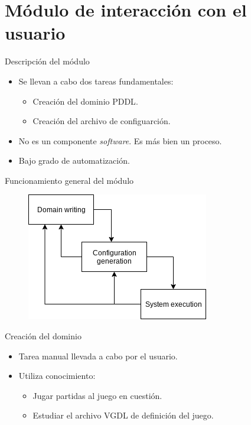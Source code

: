 \documentclass[11pt]{beamer}    %
\begin{document}
    \section{Módulo de interacción con el usuario}

    \begin{frame}{Descripción del módulo}

        \begin{itemize}
            \item Se llevan a cabo dos tareas fundamentales:
                \begin{itemize}
                    \item Creación del \alert{dominio PDDL}.
                    \item Creación del \alert{archivo de configuarción}.
                \end{itemize}
            \item No es un componente \textit{software}. Es más bien un \alert{proceso}.
            \item Bajo grado de automatización.
        \end{itemize}
    \end{frame}

    \begin{frame}{Funcionamiento general del módulo}
        \begin{figure}
            \centering
            \includegraphics[scale=0.5]{img/presentation/cascade_model}
        \end{figure}
    \end{frame}
    
    \begin{frame}{Creación del dominio}
        \begin{itemize}
            \item Tarea manual llevada a cabo por el usuario.
            \item Utiliza conocimiento:
            \begin{itemize}
                \item Jugar partidas al juego en cuestión.
                \item Estudiar el archivo VGDL de definición del juego.
            \end{itemize}
        \end{itemize}
    \end{frame}
    
\end{document}
